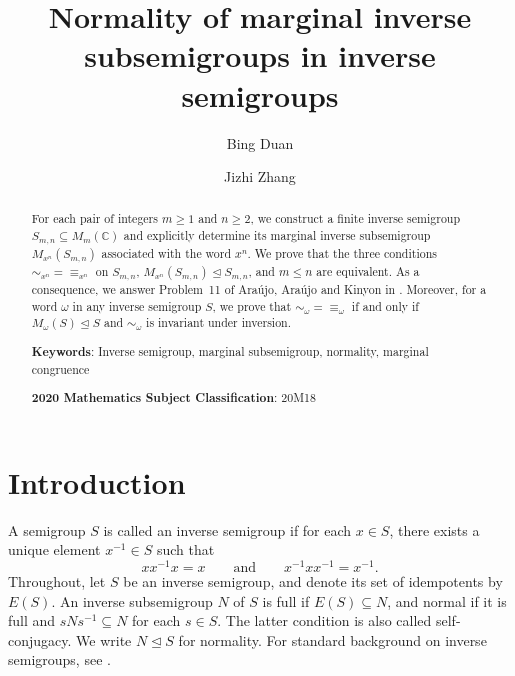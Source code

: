 \documentclass[11pt,a4paper,reqno]{amsart}
\title[Normality of marginal inverse subsemigroups in inverse semigroups]{Normality of marginal inverse subsemigroups in inverse semigroups}
\author{Bing Duan}
\author{Jizhi Zhang}
\date{}
\newcommand{\Sn}{S_{m,n}}
\newcommand{\Mn}{M_{x^n}}
\numberwithin{equation}{section}
\begin{document}
\maketitle

\begin{abstract}
For each pair of integers $m\ge1$ and $n\ge2$, we construct a finite inverse semigroup $\Sn \subseteq M_m(\mathbb C)$ and explicitly determine its marginal inverse subsemigroup $\Mn(\Sn)$ associated with the word $x^n$. We prove that the three conditions $\sim_{x^n}=\equiv_{x^n}$ on $S_{m,n}$, $\Mn(\Sn)\trianglelefteq\Sn$, and $m\le n$ are equivalent. As a consequence, we answer Problem~11 of Ara\'ujo, Ara\'ujo and Kinyon in \cite{AAK}. Moreover, for a word $\omega$ in any inverse semigroup $S$, we prove that $\sim_\omega=\equiv_\omega$  if and only if $M_\omega(S)\trianglelefteq S$ and $\sim_\omega$ is invariant under inversion.

\hspace{0.15cm}

\noindent
{\bf Keywords}: Inverse semigroup, marginal subsemigroup, normality, marginal congruence

\hspace{0.15cm}

\noindent
{\bf 2020 Mathematics Subject Classification}: 20M18
\end{abstract}

\section{Introduction}

A semigroup $S$ is called an inverse semigroup if for each $x\in S$, there exists a unique element $x^{-1}\in S$ such that
\[
xx^{-1}x=x \qquad\text{and}\qquad x^{-1}xx^{-1}=x^{-1}.
\]
Throughout, let $S$ be an inverse semigroup, and denote its set of idempotents by $E(S)$. An inverse subsemigroup $N$ of $S$ is full if $E(S)\subseteq N$, and normal if it is full and $sNs^{-1}\subseteq N$ for each $s\in S$. The latter condition is also called self-conjugacy. We write $N\trianglelefteq S$ for normality. For standard background on inverse semigroups, see \cite{Howie,Lawson}.
\end{document}
